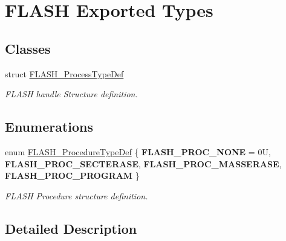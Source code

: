 \hypertarget{group___f_l_a_s_h___exported___types}{}\section{F\+L\+A\+SH Exported Types}
\label{group___f_l_a_s_h___exported___types}
\subsection*{Classes}
\begin{DoxyCompactItemize}
\item 
struct \mbox{\hyperlink{struct_f_l_a_s_h___process_type_def}{F\+L\+A\+S\+H\+\_\+\+Process\+Type\+Def}}
\begin{DoxyCompactList}\small\item\em F\+L\+A\+SH handle Structure definition. \end{DoxyCompactList}\end{DoxyCompactItemize}
\subsection*{Enumerations}
\begin{DoxyCompactItemize}
\item 
\mbox{\label{group___f_l_a_s_h___exported___types_ga2b0268387bc11bcab76be9ce7c43eaaf}} 
enum \mbox{\hyperlink{group___f_l_a_s_h___exported___types_ga2b0268387bc11bcab76be9ce7c43eaaf}{F\+L\+A\+S\+H\+\_\+\+Procedure\+Type\+Def}} \{ {\bfseries F\+L\+A\+S\+H\+\_\+\+P\+R\+O\+C\+\_\+\+N\+O\+NE} = 0U, 
{\bfseries F\+L\+A\+S\+H\+\_\+\+P\+R\+O\+C\+\_\+\+S\+E\+C\+T\+E\+R\+A\+SE}, 
{\bfseries F\+L\+A\+S\+H\+\_\+\+P\+R\+O\+C\+\_\+\+M\+A\+S\+S\+E\+R\+A\+SE}, 
{\bfseries F\+L\+A\+S\+H\+\_\+\+P\+R\+O\+C\+\_\+\+P\+R\+O\+G\+R\+AM}
 \}
\begin{DoxyCompactList}\small\item\em F\+L\+A\+SH Procedure structure definition. \end{DoxyCompactList}\end{DoxyCompactItemize}


\subsection{Detailed Description}
